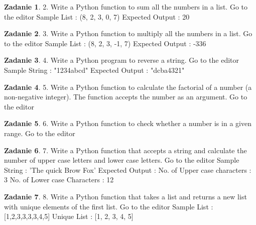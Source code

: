 \documentclass[11pt]{article}
\theoremstyle{definition}
\newtheorem{zadanie}{Zadanie}
\begin{document}
\begin{zadanie}


2. Write a Python function to sum all the numbers in a list. Go to the editor
Sample List : (8, 2, 3, 0, 7)
Expected Output : 20


\end{zadanie}

\begin{zadanie}


3. Write a Python function to multiply all the numbers in a list. Go to the editor
Sample List : (8, 2, 3, -1, 7)
Expected Output : -336


\end{zadanie}

\begin{zadanie}


4. Write a Python program to reverse a string. Go to the editor
Sample String : "1234abcd"
Expected Output : "dcba4321"


\end{zadanie}

\begin{zadanie}


5. Write a Python function to calculate the factorial of a number (a non-negative integer). The function accepts the number as an argument. Go to the editor


\end{zadanie}

\begin{zadanie}


6. Write a Python function to check whether a number is in a given range. Go to the editor


\end{zadanie}

\begin{zadanie}


7. Write a Python function that accepts a string and calculate the number of upper case letters and lower case letters. Go to the editor
Sample String : 'The quick Brow Fox'
Expected Output :
No. of Upper case characters : 3
No. of Lower case Characters : 12


\end{zadanie}

\begin{zadanie}


8. Write a Python function that takes a list and returns a new list with unique elements of the first list. Go to the editor
Sample List : [1,2,3,3,3,3,4,5]
Unique List : [1, 2, 3, 4, 5]


\end{zadanie}
\end{document}
